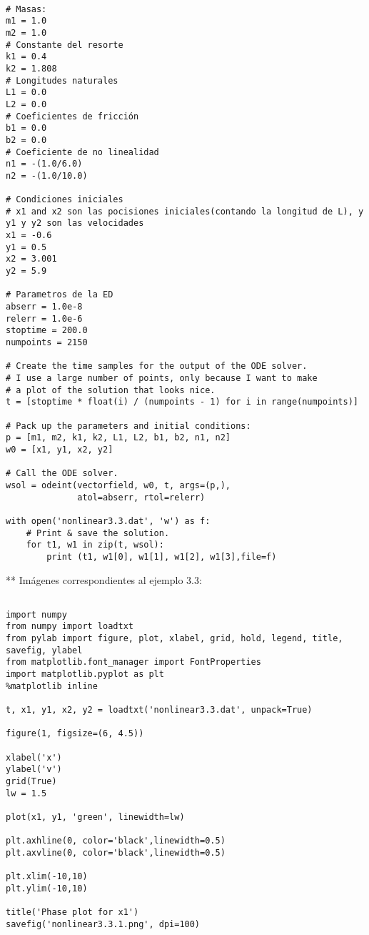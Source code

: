\documentclass{article} %
\begin{document}
\begin{verbatim} 

# Masas:
m1 = 1.0
m2 = 1.0
# Constante del resorte
k1 = 0.4
k2 = 1.808
# Longitudes naturales
L1 = 0.0
L2 = 0.0
# Coeficientes de fricción
b1 = 0.0
b2 = 0.0
# Coeficiente de no linealidad
n1 = -(1.0/6.0)
n2 = -(1.0/10.0)

# Condiciones iniciales
# x1 and x2 son las pocisiones iniciales(contando la longitud de L), y y1 y y2 son las velocidades
x1 = -0.6
y1 = 0.5
x2 = 3.001
y2 = 5.9

# Parametros de la ED
abserr = 1.0e-8
relerr = 1.0e-6
stoptime = 200.0
numpoints = 2150

# Create the time samples for the output of the ODE solver.
# I use a large number of points, only because I want to make
# a plot of the solution that looks nice.
t = [stoptime * float(i) / (numpoints - 1) for i in range(numpoints)]

# Pack up the parameters and initial conditions:
p = [m1, m2, k1, k2, L1, L2, b1, b2, n1, n2]
w0 = [x1, y1, x2, y2]

# Call the ODE solver.
wsol = odeint(vectorfield, w0, t, args=(p,),
              atol=abserr, rtol=relerr)

with open('nonlinear3.3.dat', 'w') as f:
    # Print & save the solution.
    for t1, w1 in zip(t, wsol):
        print (t1, w1[0], w1[1], w1[2], w1[3],file=f)

\end{verbatim}


** Imágenes correspondientes al ejemplo 3.3:


\begin{verbatim} 

import numpy 
from numpy import loadtxt
from pylab import figure, plot, xlabel, grid, hold, legend, title, savefig, ylabel
from matplotlib.font_manager import FontProperties
import matplotlib.pyplot as plt
%matplotlib inline

t, x1, y1, x2, y2 = loadtxt('nonlinear3.3.dat', unpack=True)

figure(1, figsize=(6, 4.5))

xlabel('x')
ylabel('v')
grid(True)
lw = 1.5

plot(x1, y1, 'green', linewidth=lw)

plt.axhline(0, color='black',linewidth=0.5)
plt.axvline(0, color='black',linewidth=0.5)

plt.xlim(-10,10)
plt.ylim(-10,10)

title('Phase plot for x1')
savefig('nonlinear3.3.1.png', dpi=100)


\end{verbatim}
\end{document}
